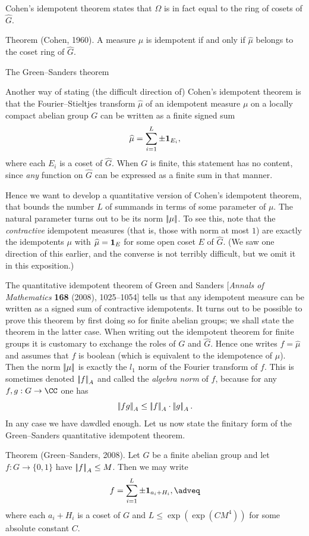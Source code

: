 Cohen's idempotent theorem states that $\Omega$ is in fact equal to the ring of cosets of $\hat G$.

\edef\thmcohen{\the\sectcount.\the\thmcount}
\parenproclaim Theorem {\advthm} (Cohen, {\rm 1960}).
A measure $\mu$ is idempotent if and only if $\hat\mu$ belongs to the coset ring of $\hat G$.

\advsect The Green--Sanders theorem

Another way of stating (the difficult direction of) Cohen's idempotent theorem is that the
Fourier--Stieltjes transform $\hat\mu$ of an idempotent measure $\mu$ on a locally compact abelian group
$G$ can be written as a finite signed sum
$$\widehat\mu = \sum_{i=1}^L \pm{\bf 1}_{E_i},$$
where each $E_i$ is a coset of $\hat G$. When $G$ is finite, this statement has no content, since
{\it any} function on $\hat G$ can be expressed as a finite sum in that manner.

Hence we want to develop a quantitative version of Cohen's idempotent theorem, that bounds the number
$L$ of summands in terms of some parameter of $\mu$. The natural parameter turns out to be its norm
$\left|\!\left|\mu\right|\!\right|$. To see this, note that the {\it contractive} idempotent measures (that is, those with norm
at most $1$) are exactly the idempotents $\mu$ with
$\widehat\mu = {\bf 1}_E$ for some open coset $E$ of $\hat G$. (We saw one direction of this earlier, and the converse
is not terribly difficult, but we omit it in this exposition.)

The quantitative idempotent theorem of Green and Sanders [{\sl Annals of Mathematics} {\bf 168} (2008),
1025--1054] tells us that any idempotent measure can be written as a signed sum of contractive idempotents.
It turns out to be possible to prove this theorem by first doing so for finite abelian groups; we shall state
the theorem in the latter case. When writing out the idempotent theorem for finite groups it is customary
to exchange the roles of $G$ and $\hat G$. Hence one writes $f = \hat\mu$ and assumes that $f$ is boolean
(which is equivalent to the idempotence of $\mu$). Then the norm $\left|\!\left|\mu\right|\!\right|$ is exactly the $l_1$ norm
of the Fourier transform of $f$. This is sometimes denoted $\left|\!\left|f\right|\!\right|_A$ and
called the {\it algebra norm} of $f$, because for any $f,g:G\to\CC$ one has
$$\left|\!\left|fg\right|\!\right|_A\le \left|\!\left|f\right|\!\right|_A\cdot\left|\!\left|g\right|\!\right|_A.$$
In any case we have dawdled enough. Let us now state the finitary form of the Green--Sanders quantitative
idempotent theorem.

\parenproclaim Theorem {\advthm} (Green--Sanders, {\rm 2008}).
Let $G$ be a finite abelian group and let $f:G\to \{0,1\}$ have $\left|\!\left|f\right|\!\right|_A\le M$. Then we may write
\global\edef\eqgreensanders{\the\eqcount}
$$f = \sum_{i=1}^L \pm \one_{a_i + H_i},\adveq$$
where each $a_i+H_i$ is a coset of $G$ and $L\le \exp(\exp(CM^4))$ for some absolute constant $C$.

